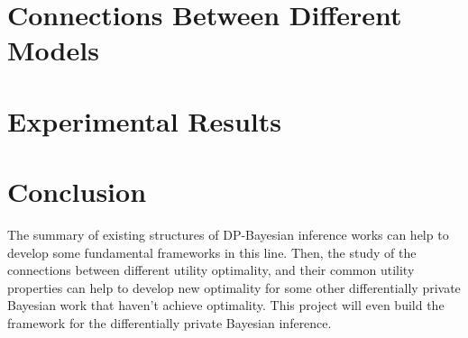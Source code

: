 \documentclass{article}
\begin{document}
\section{Connections Between Different Models}

\section{Experimental Results}

\section{Conclusion}
The summary of existing structures of DP-Bayesian inference works can help to develop some fundamental frameworks in this line. Then, the study of the connections between different utility optimality, and their common utility properties can help to develop new optimality for some other differentially private Bayesian work that haven't achieve optimality. This project will even build the framework for the differentially private Bayesian inference.


\newpage


\end{document}
